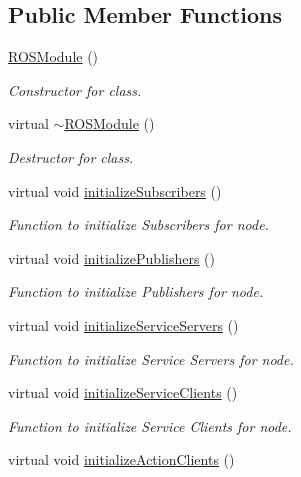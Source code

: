 \subsection*{Public Member Functions}
\begin{DoxyCompactItemize}
\item 
\hyperlink{classROSModule_a9efc72cd6ded210f0d140e03f6350ba2}{R\+O\+S\+Module} ()
\begin{DoxyCompactList}\small\item\em Constructor for class. \end{DoxyCompactList}\item 
virtual \hyperlink{classROSModule_afeaee6a49e898dbb1ad723270103a66e}{$\sim$\+R\+O\+S\+Module} ()
\begin{DoxyCompactList}\small\item\em Destructor for class. \end{DoxyCompactList}\item 
virtual void \hyperlink{classROSModule_a0e7a0518c74867505a4e8217c4413646}{initialize\+Subscribers} ()
\begin{DoxyCompactList}\small\item\em Function to initialize Subscribers for node. \end{DoxyCompactList}\item 
virtual void \hyperlink{classROSModule_afb506fedd0ac2412652618cd1e1d8e8e}{initialize\+Publishers} ()
\begin{DoxyCompactList}\small\item\em Function to initialize Publishers for node. \end{DoxyCompactList}\item 
virtual void \hyperlink{classROSModule_acdaf5d8d272814d30b9c15b9b20941ee}{initialize\+Service\+Servers} ()
\begin{DoxyCompactList}\small\item\em Function to initialize Service Servers for node. \end{DoxyCompactList}\item 
virtual void \hyperlink{classROSModule_a0155f960b33c0fb387ff5ef37fab743b}{initialize\+Service\+Clients} ()
\begin{DoxyCompactList}\small\item\em Function to initialize Service Clients for node. \end{DoxyCompactList}\item 
virtual void \hyperlink{classROSModule_a01c3d63aec5aeec426b16aacf2a0c756}{initialize\+Action\+Clients} ()

\end{DoxyCompactItemize}
